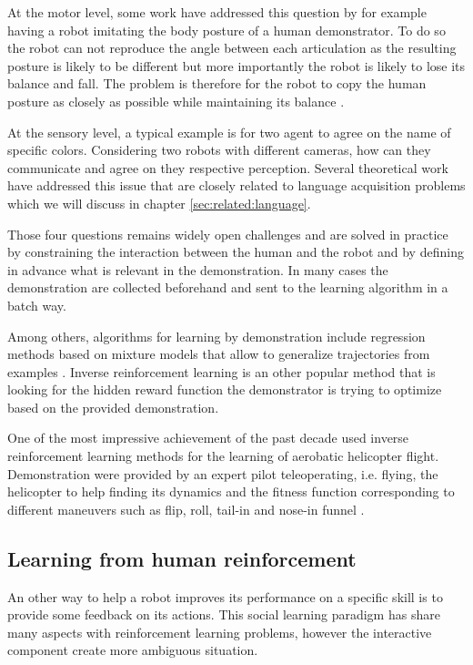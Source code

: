 \begin{itemize}
At the motor level, some work have addressed this question by for example having a robot imitating the body posture of a human demonstrator. To do so the robot can not reproduce the angle between each articulation as the resulting posture is likely to be different but more importantly the robot is likely to lose its balance and fall. The problem is therefore for the robot to copy the human posture as closely as possible while maintaining its balance \cite{hyon2007full,yamane2009simultaneous}. 

At the sensory level, a typical example is for two agent to agree on the name of specific colors. Considering two robots with different cameras, how can they communicate and agree on they respective perception. Several theoretical work have addressed this issue \cite{cangelosi2001adaptive,steels2005coordinating} that are closely related to language acquisition problems which we will discuss in chapter \ref{sec:related:language}.

\end{itemize}

Those four questions remains widely open challenges and are solved in practice by constraining the interaction between the human and the robot and by defining in advance what is relevant in the demonstration. In many cases the demonstration are collected beforehand and sent to the learning algorithm in a batch way.

Among others, algorithms for learning by demonstration include regression methods based on mixture models that allow to generalize trajectories from examples \cite{calinon07}. Inverse reinforcement learning \cite{Abbeel04icml} is an other popular method that is looking for the hidden reward function the demonstrator is trying to optimize based on the provided demonstration.

One of the most impressive achievement of the past decade used inverse reinforcement learning methods for the learning of aerobatic helicopter flight. Demonstration were provided by an expert pilot teleoperating, i.e. flying, the helicopter to help finding its dynamics and the fitness function corresponding to different maneuvers such as flip, roll, tail-in and nose-in funnel \cite{abbeel2007application}.

\subsection{Learning from human reinforcement}

An other way to help a robot improves its performance on a specific skill is to provide some feedback on its actions. This social learning paradigm has share many aspects with reinforcement learning problems, however the interactive component create more ambiguous situation. 

